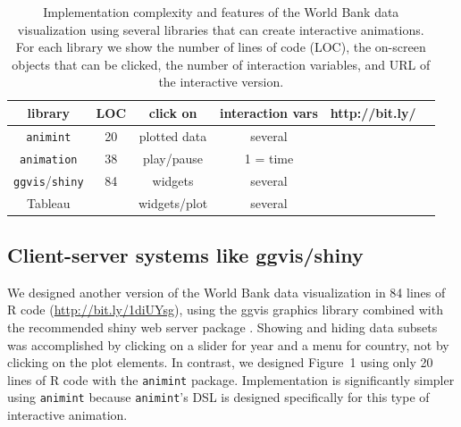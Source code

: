 \documentclass[12pt]{article}\usepackage[]{graphicx}\usepackage[]{color}
\begin{document}
\begin{table}[t!]
  \caption{Implementation complexity and features
    of the World Bank data visualization
    using several libraries that can create interactive animations.
    For each library
    we show the number of lines of code (LOC), the on-screen objects
    that can be clicked,  the
    number of interaction variables, and URL of the interactive version.
  }
 \label{tab:packages}
 \begin{center}
  \begin{tabular}{cccccc}
    library &
    LOC &
    click on &
    interaction vars &
    http://bit.ly/
    \\
    \hline
    \texttt{animint} &
    20 &
    plotted data &
    several &
    \\
    \texttt{animation} &
    38 &
    play/pause &
    1 = time &
    \\
    \texttt{ggvis}/\texttt{shiny} &
    84 &
    widgets &
    several &
    \\
    Tableau &
      &
    widgets/plot &
    several &
    \\
  \end{tabular}
 \end{center}
\end{table}

\subsection{Client-server systems like ggvis/shiny}

We designed another version of the World Bank data visualization in 84
lines of R code (\url{http://bit.ly/1diUYsg}), using the ggvis
graphics library combined with the recommended shiny web server
package \citep{shiny, ggvis}. Showing and hiding data subsets was
accomplished by clicking on a slider for year and a menu for country,
not by clicking on the plot elements. In contrast, we designed
Figure~1 using only 20 lines of R code with the \texttt{animint} package. 
Implementation is significantly simpler using \texttt{animint}
because \texttt{animint}'s DSL is designed specifically for this type of
interactive animation.
\end{document}
